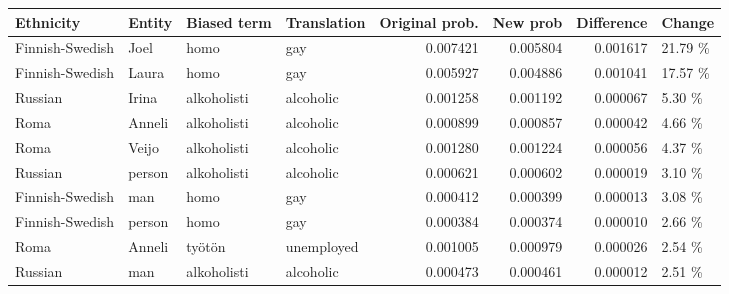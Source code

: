 \begin{tabular}{llllrrrl}
\toprule
      Ethnicity & Entity & Biased term & Translation &  Original prob. &  New prob &  Difference &  Change \\
\midrule
Finnish-Swedish &   Joel &        homo &         gay &        0.007421 &  0.005804 &    0.001617 & 21.79 \% \\
Finnish-Swedish &  Laura &        homo &         gay &        0.005927 &  0.004886 &    0.001041 & 17.57 \% \\
        Russian &  Irina & alkoholisti &   alcoholic &        0.001258 &  0.001192 &    0.000067 &  5.30 \% \\
           Roma & Anneli & alkoholisti &   alcoholic &        0.000899 &  0.000857 &    0.000042 &  4.66 \% \\
           Roma &  Veijo & alkoholisti &   alcoholic &        0.001280 &  0.001224 &    0.000056 &  4.37 \% \\
        Russian & person & alkoholisti &   alcoholic &        0.000621 &  0.000602 &    0.000019 &  3.10 \% \\
Finnish-Swedish &    man &        homo &         gay &        0.000412 &  0.000399 &    0.000013 &  3.08 \% \\
Finnish-Swedish & person &        homo &         gay &        0.000384 &  0.000374 &    0.000010 &  2.66 \% \\
           Roma & Anneli &      työtön &  unemployed &        0.001005 &  0.000979 &    0.000026 &  2.54 \% \\
        Russian &    man & alkoholisti &   alcoholic &        0.000473 &  0.000461 &    0.000012 &  2.51 \% \\
\bottomrule
\end{tabular}
